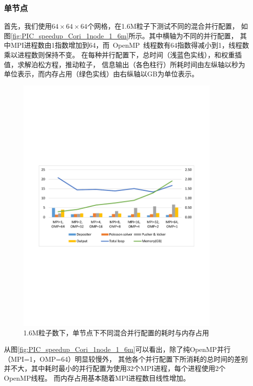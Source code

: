 \subsubsection{单节点}
首先，我们使用$64 \times 64 \times 64$个网格，在1.6M粒子下测试不同的混合并行配置，
如图\eqref{fig:PIC_speedup_Cori_1node_1_6m}所示。其中横轴为不同的并行配置，
其中MPI进程数由1指数增加到64，而~OpenMP~线程数有64指数得减小到1，线程数乘以进程数则保持不变。
在每种并行配置下，总时间（浅蓝色实线），和权重插值，求解泊松方程，推动粒子，
信息输出（各色柱行）所耗时间由左纵轴以秒为单位表示，而内存占用（绿色实线）由右纵轴以GB为单位表示。

\begin{figure}[!htb]
  \centering
  \includegraphics[width=0.9\textwidth]{Img/PIC_speedup_Cori_1node_1_6m.pdf}
  \caption{1.6M粒子数下，单节点下不同混合并行配置的耗时与内存占用}
  \label{fig:PIC_speedup_Cori_1node_1_6m}
\end{figure}

从图\eqref{fig:PIC_speedup_Cori_1node_1_6m}可以看出，除了纯OpenMP并行（MPI=1，OMP=64）明显较慢外，
其他各个并行配置下所消耗的总时间的差别并不大，其中耗时最小的并行配置为使用32个MPI进程，每个进程使用2个OpenMP线程。
而内存占用基本随着MPI进程数目线性增加。


